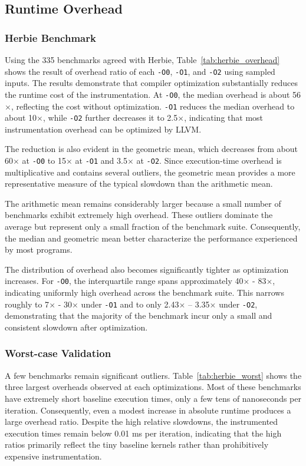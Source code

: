 \subsection{Runtime Overhead}
\label{sec:runtimeoverhead}

\subsubsection{Herbie Benchmark}
\label{sec:herbie_overhead}
Using the 335 benchmarks agreed with Herbie, Table~\ref{tab:herbie_overhead} shows the result of overhead ratio of each \texttt{-O0}, \texttt{-O1}, and \texttt{-O2} using sampled inputs. The results demonstrate that compiler optimization substantially reduces the runtime cost of the instrumentation. At \texttt{-O0}, the median overhead is about 56$\times$, reflecting the cost without optimization. \texttt{-O1} reduces the median overhead to about 10$\times$, while \texttt{-O2} further decreases it to 2.5$\times$, indicating that most instrumentation overhead can be optimized by LLVM.

The reduction is also evident in the geometric mean, which decreases from about 60$\times$ at \texttt{-O0} to 15$\times$ at \texttt{-O1} and 3.5$\times$ at \texttt{-O2}. Since execution-time overhead is multiplicative and contains several outliers, the geometric mean provides a more representative measure of the typical slowdown than the arithmetic mean.

The arithmetic mean remains considerably larger because a small number of benchmarks exhibit extremely high overhead. These outliers dominate the average but represent only a small fraction of the benchmark suite. Consequently, the median and geometric mean better characterize the performance experienced by most programs.

The distribution of overhead also becomes significantly tighter as optimization increases. For \texttt{-O0}, the interquartile range spans approximately 40$\times$ - 83$\times$, indicating uniformly high overhead across the benchmark suite. This narrows roughly to 7$\times$ - 30$\times$ under \texttt{-O1} and to only 2.43$\times$ – 3.35$\times$ under \texttt{-O2}, demonstrating that the majority of the benchmark incur only a small and consistent slowdown after optimization.



\subsubsection{Worst-case Validation}
\label{worstcase}
A few benchmarks remain significant outliers. Table~\ref{tab:herbie_worst} shows the three largest overheads observed at each optimizations. Most of these benchmarks have extremely short baseline execution times, only a few tens of nanoseconds per iteration. Consequently, even a modest increase in absolute runtime produces a large overhead ratio. Despite the high relative slowdowns, the instrumented execution times remain below 0.01 ms per iteration, indicating that the high ratios primarily reflect the tiny baseline kernels rather than prohibitively expensive instrumentation.

